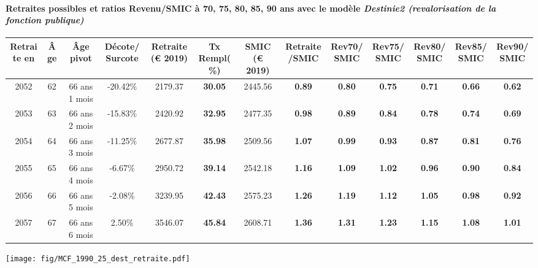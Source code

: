 \paragraph{Retraites possibles et ratios Revenu/SMIC à 70, 75, 80, 85, 90 ans avec le modèle \emph{Destinie2 (revalorisation de la fonction publique)}}  
 
{ \scriptsize \begin{center} 
\begin{tabular}[htb]{|c|c||c|c||c|c||c||c|c|c|c|c|c|} 
\hline 
 Retraite en &  Âge &  Âge pivot &  Décote/Surcote &  Retraite (\euro{} 2019) &  Tx Rempl(\%) &  SMIC (\euro{} 2019) &  Retraite/SMIC &  Rev70/SMIC &  Rev75/SMIC &  Rev80/SMIC &  Rev85/SMIC &  Rev90/SMIC \\ 
\hline \hline 
 2052 &  62 &  66 ans 1 mois &  -20.42\% &  2179.37 &  {\bf 30.05} &  2445.56 &  {\bf {\color{red} 0.89}} &  {\bf {\color{red} 0.80}} &  {\bf {\color{red} 0.75}} &  {\bf {\color{red} 0.71}} &  {\bf {\color{red} 0.66}} &  {\bf {\color{red} 0.62}} \\ 
\hline 
 2053 &  63 &  66 ans 2 mois &  -15.83\% &  2420.92 &  {\bf 32.95} &  2477.35 &  {\bf {\color{red} 0.98}} &  {\bf {\color{red} 0.89}} &  {\bf {\color{red} 0.84}} &  {\bf {\color{red} 0.78}} &  {\bf {\color{red} 0.74}} &  {\bf {\color{red} 0.69}} \\ 
\hline 
 2054 &  64 &  66 ans 3 mois &  -11.25\% &  2677.87 &  {\bf 35.98} &  2509.56 &  {\bf 1.07} &  {\bf {\color{red} 0.99}} &  {\bf {\color{red} 0.93}} &  {\bf {\color{red} 0.87}} &  {\bf {\color{red} 0.81}} &  {\bf {\color{red} 0.76}} \\ 
\hline 
 2055 &  65 &  66 ans 4 mois &  -6.67\% &  2950.72 &  {\bf 39.14} &  2542.18 &  {\bf 1.16} &  {\bf 1.09} &  {\bf 1.02} &  {\bf {\color{red} 0.96}} &  {\bf {\color{red} 0.90}} &  {\bf {\color{red} 0.84}} \\ 
\hline 
 2056 &  66 &  66 ans 5 mois &  -2.08\% &  3239.95 &  {\bf 42.43} &  2575.23 &  {\bf 1.26} &  {\bf 1.19} &  {\bf 1.12} &  {\bf 1.05} &  {\bf {\color{red} 0.98}} &  {\bf {\color{red} 0.92}} \\ 
\hline 
 2057 &  67 &  66 ans 6 mois &  2.50\% &  3546.07 &  {\bf 45.84} &  2608.71 &  {\bf 1.36} &  {\bf 1.31} &  {\bf 1.23} &  {\bf 1.15} &  {\bf 1.08} &  {\bf 1.01} \\ 
\hline 
\hline 
\end{tabular} 
\end{center} } 

 \begin{center}\texttt{[image: fig/MCF\_1990\_25\_dest\_retraite.pdf]}\end{center} \label{fig/MCF_1990_25_dest_retraite.pdf} 

